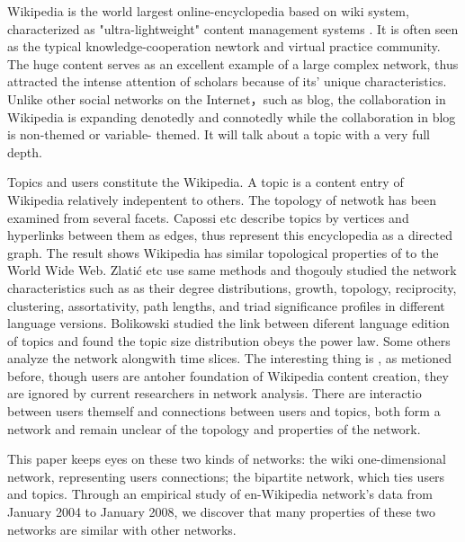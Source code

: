\documentclass{elsarticle}
\begin{document}

Wikipedia is the world largest online-encyclopedia based on wiki
system,  characterized as "ultra-lightweight" content management systems
\cite{mattison2003qst}. It is often seen as the typical knowledge-cooperation newtork and virtual
practice community. The huge content serves as an excellent example of
a large complex network\cite{Barabasi2003}, thus attracted the intense attention of scholars
because of its' unique characteristics. Unlike other social networks on the
Internet，such as blog,  the
collaboration in Wikipedia is expanding denotedly and connotedly while the collaboration in blog is non-themed or variable- themed. It will talk about a topic with a very full depth\cite{Sauer2005}.

Topics and users constitute the Wikipedia. A topic is a content entry
of Wikipedia relatively indepentent to others. The topology of netwotk  has
been examined
 from several facets. Capossi etc describe topics by vertices and hyperlinks between them as edges, thus represent
this encyclopedia as a directed graph\cite{capocci-2006}. The result shows Wikipedia has
similar topological properties of to the World Wide Web. Zlati\'{c} etc use
same methods and thogouly studied the network characteristics such as as their degree distributions, growth, topology, reciprocity, clustering, assortativity, path lengths, and triad
signiﬁcance proﬁles in different language versions\cite{zlatic:016115}. Bolikowski
studied the link between diferent language edition of topics and found
the topic size distribution obeys the power law\cite{bolikowski-2009}. Some others analyze
the network alongwith time slices\cite{buriol2006taw}. The interesting thing is
, as metioned before, though users are antoher foundation of Wikipedia
content creation, they are ignored by current researchers in network
analysis. There are interactio between users themself and connections
between users and topics, both form a network and remain unclear of the topology and
properties of the network.    



 This paper keeps eyes  on these two kinds of networks: the wiki
 one-dimensional network, representing users connections; the
 bipartite network, which ties users and topics. Through an
 empirical study of en-Wikipedia network’s data  from January
 2004 to January 2008, we discover that many properties of these two networks are similar with other networks. 
\end{document}
